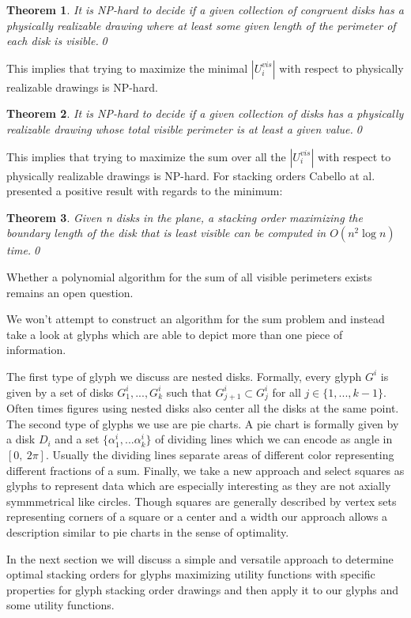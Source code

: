 \documentclass[a4paper,11pt]{article}
\newtheorem{theorem}{Theorem}
\begin{document}
\begin{theorem}
  It is NP-hard to decide if a given collection of congruent disks has a
  physically realizable drawing where at least some given length of the perimeter of
  each disk is visible.\qed
\end{theorem}
This implies that trying to maximize the minimal $|U_i^{vis}|$ with respect to physically realizable drawings is NP-hard.
\begin{theorem}
  It is NP-hard to decide if a given collection of disks has a physically
  realizable drawing whose total visible perimeter is at least a given value.\qed
\end{theorem}
This implies that trying to maximize the sum over all the $|U_i^{vis}|$ with respect to physically realizable drawings is NP-hard.
For stacking orders Cabello at al. presented a positive result with regards to the minimum:
\begin{theorem}
  Given n disks in the plane, a stacking order maximizing the boundary
  length of the disk that is least visible can be computed in $O(n^2 \log n)$ time.\qed
\end{theorem}

Whether a polynomial algorithm for the sum of all visible perimeters exists remains an open question.

\newpage

We won't attempt to construct an algorithm for the sum problem and instead take a look at glyphs which are able to depict more than one piece of information.

The first type of glyph we discuss are nested disks. Formally, every glyph $G^i$ is given by a set of disks $G^i_1,...,G^i_k$ such that $G^i_{j+1}\subset G^i_j$ for all $j\in \{1,...,k-1 \}$. Often times figures using nested disks also center all the disks at the same point.
The second type of glyphs we use are pie charts. A pie chart is formally given by a disk $D_i$ and a set $\{\alpha_1^i,...\alpha_k^i\}$ of dividing lines which we can encode as angle in $[0,\ 2\pi]$. Usually the dividing lines separate areas of different color representing different fractions of a sum.
Finally, we take a new approach and select squares as glyphs to represent data which are especially interesting as they are not axially symmmetrical like circles. Though squares are generally described by vertex sets representing corners of a square or a center and a width our approach allows a description similar to pie charts in the sense of optimality.

In the next section we will discuss a simple and versatile approach to determine optimal stacking orders for glyphs maximizing utility functions with specific properties for glyph stacking order drawings and then apply it to our glyphs and some utility functions.
\end{document}
